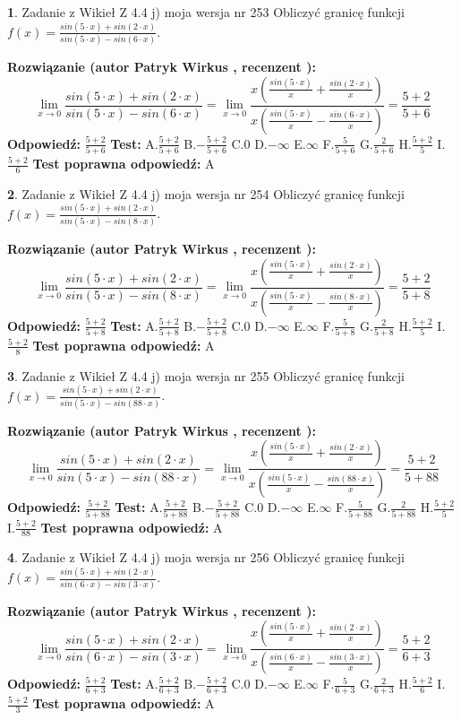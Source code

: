 \documentclass[12pt, a4paper]{article}
\theoremstyle{definition} %
\newtheorem{zad}{}
\newcommand{\zadStart}[1]{\begin{zad}#1\newline}
\newcommand{\zadStop}{\end{zad}}
\newcommand{\rozwStart}[2]{\noindent \textbf{Rozwiązanie (autor #1 , recenzent #2): }\newline}
\newcommand{\rozwStop}{\newline}
\newcommand{\odpStart}{\noindent \textbf{Odpowiedź:}\newline}
\newcommand{\odpStop}{\newline}
\newcommand{\testStart}{\noindent \textbf{Test:}\newline}
\newcommand{\testStop}{\newline}
\newcommand{\kluczStart}{\noindent \textbf{Test poprawna odpowiedź:}\newline}
\newcommand{\kluczStop}{\newline}
\begin{document}
\zadStart{Zadanie z Wikieł Z 4.4 j) moja wersja nr 253}
Obliczyć granicę funkcji $f(x)=\frac{sin(5\cdot x) +sin(2\cdot x)}{sin(5\cdot x) -sin(6\cdot x)}$.
\zadStop
\rozwStart{Patryk Wirkus}{}
$$\lim\limits_{x\to 0}\frac{sin(5\cdot x) +sin(2\cdot x)}{sin(5\cdot x) -sin(6\cdot x)}=\lim\limits_{x\to 0}\frac{x(\frac{sin(5\cdot x)}{x}+\frac{sin(2\cdot x)}{x})}{x(\frac{sin(5\cdot x)}{x}-\frac{sin(6\cdot x)}{x})}=\frac{5+2}{5+6}$$
\rozwStop
\odpStart
$\frac{5+2}{5+6}$
\odpStop
\testStart
A.$\frac{5+2}{5+6}$
B.$-\frac{5+2}{5+6}$
C.$0$
D.$-\infty$
E.$\infty$
F.$\frac{5}{5+6}$
G.$\frac{2}{5+6}$
H.$\frac{5+2}{5}$
I.$\frac{5+2}{6}$
\testStop
\kluczStart
A
\kluczStop



\zadStart{Zadanie z Wikieł Z 4.4 j) moja wersja nr 254}
Obliczyć granicę funkcji $f(x)=\frac{sin(5\cdot x) +sin(2\cdot x)}{sin(5\cdot x) -sin(8\cdot x)}$.
\zadStop
\rozwStart{Patryk Wirkus}{}
$$\lim\limits_{x\to 0}\frac{sin(5\cdot x) +sin(2\cdot x)}{sin(5\cdot x) -sin(8\cdot x)}=\lim\limits_{x\to 0}\frac{x(\frac{sin(5\cdot x)}{x}+\frac{sin(2\cdot x)}{x})}{x(\frac{sin(5\cdot x)}{x}-\frac{sin(8\cdot x)}{x})}=\frac{5+2}{5+8}$$
\rozwStop
\odpStart
$\frac{5+2}{5+8}$
\odpStop
\testStart
A.$\frac{5+2}{5+8}$
B.$-\frac{5+2}{5+8}$
C.$0$
D.$-\infty$
E.$\infty$
F.$\frac{5}{5+8}$
G.$\frac{2}{5+8}$
H.$\frac{5+2}{5}$
I.$\frac{5+2}{8}$
\testStop
\kluczStart
A
\kluczStop



\zadStart{Zadanie z Wikieł Z 4.4 j) moja wersja nr 255}
Obliczyć granicę funkcji $f(x)=\frac{sin(5\cdot x) +sin(2\cdot x)}{sin(5\cdot x) -sin(88\cdot x)}$.
\zadStop
\rozwStart{Patryk Wirkus}{}
$$\lim\limits_{x\to 0}\frac{sin(5\cdot x) +sin(2\cdot x)}{sin(5\cdot x) -sin(88\cdot x)}=\lim\limits_{x\to 0}\frac{x(\frac{sin(5\cdot x)}{x}+\frac{sin(2\cdot x)}{x})}{x(\frac{sin(5\cdot x)}{x}-\frac{sin(88\cdot x)}{x})}=\frac{5+2}{5+88}$$
\rozwStop
\odpStart
$\frac{5+2}{5+88}$
\odpStop
\testStart
A.$\frac{5+2}{5+88}$
B.$-\frac{5+2}{5+88}$
C.$0$
D.$-\infty$
E.$\infty$
F.$\frac{5}{5+88}$
G.$\frac{2}{5+88}$
H.$\frac{5+2}{5}$
I.$\frac{5+2}{88}$
\testStop
\kluczStart
A
\kluczStop



\zadStart{Zadanie z Wikieł Z 4.4 j) moja wersja nr 256}
Obliczyć granicę funkcji $f(x)=\frac{sin(5\cdot x) +sin(2\cdot x)}{sin(6\cdot x) -sin(3\cdot x)}$.
\zadStop
\rozwStart{Patryk Wirkus}{}
$$\lim\limits_{x\to 0}\frac{sin(5\cdot x) +sin(2\cdot x)}{sin(6\cdot x) -sin(3\cdot x)}=\lim\limits_{x\to 0}\frac{x(\frac{sin(5\cdot x)}{x}+\frac{sin(2\cdot x)}{x})}{x(\frac{sin(6\cdot x)}{x}-\frac{sin(3\cdot x)}{x})}=\frac{5+2}{6+3}$$
\rozwStop
\odpStart
$\frac{5+2}{6+3}$
\odpStop
\testStart
A.$\frac{5+2}{6+3}$
B.$-\frac{5+2}{6+3}$
C.$0$
D.$-\infty$
E.$\infty$
F.$\frac{5}{6+3}$
G.$\frac{2}{6+3}$
H.$\frac{5+2}{6}$
I.$\frac{5+2}{3}$
\testStop
\kluczStart
A
\kluczStop
\end{document}
